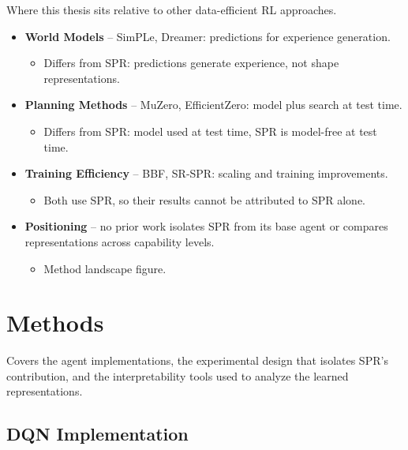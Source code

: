 \documentclass[11pt]{article}
\begin{document}
\noindent Where this thesis sits relative to other data-efficient RL
approaches.

\begin{itemize}
\item \textbf{World Models} -- SimPLe, Dreamer: predictions for
  experience generation.
  \begin{itemize}[label=$\circ$, itemsep=0.2em, parsep=0pt, topsep=0pt, partopsep=0pt]
  \item Differs from SPR: predictions generate experience, not
    shape representations.
  \end{itemize}
\item \textbf{Planning Methods} -- MuZero, EfficientZero: model
  plus search at test time.
  \begin{itemize}[label=$\circ$, itemsep=0.2em, parsep=0pt, topsep=0pt, partopsep=0pt]
  \item Differs from SPR: model used at test time, SPR is
    model-free at test time.
  \end{itemize}
\item \textbf{Training Efficiency} -- BBF, SR-SPR: scaling and
  training improvements.
  \begin{itemize}[label=$\circ$, itemsep=0.2em, parsep=0pt, topsep=0pt, partopsep=0pt]
  \item Both use SPR, so their results cannot be attributed to
    SPR alone.
  \end{itemize}
\item \textbf{Positioning} -- no prior work isolates SPR from its
  base agent or compares representations across capability levels.
  \begin{itemize}[label=$\circ$, itemsep=0.2em, parsep=0pt, topsep=0pt, partopsep=0pt]
  \item Method landscape figure.
  \end{itemize}
\end{itemize}

\section{Methods}

\noindent Covers the agent implementations, the experimental design
that isolates SPR's contribution, and the interpretability tools used
to analyze the learned representations.

\subsection{DQN Implementation}
\end{document}
